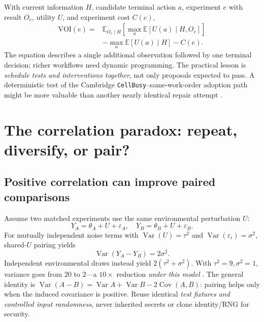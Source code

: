 \documentclass[10pt,twocolumn]{article}
\newcommand{\Ee}{\mathbb E}
\begin{document}
With current information $H$, candidate terminal action $a$, experiment $e$ with result $O_e$, utility $U$, and experiment cost $C(e),$
\begin{equation}\label{eq:voi}
\begin{aligned}
\mathrm{VOI}(e)={}&\Ee_{O_e\mid H}\!\left[\max_a\Ee[U(a)\mid H,O_e]\right]\\[-1pt]
&-\max_a\Ee[U(a)\mid H]-C(e).
\end{aligned}
\end{equation}
The equation describes a single additional observation followed by one terminal decision; richer workflows need dynamic programming. The practical lesson is \emph{schedule tests and interventions together}, not only proposals expected to pass. A deterministic test of the Cambridge \texttt{CellBusy}--same-work-order adoption path might be more valuable than another nearly identical repair attempt \cite{cam}.

\section{The correlation paradox: repeat, diversify, or pair?}

\subsection{Positive correlation can improve paired comparisons}
Assume two matched experiments use the same environmental perturbation $U$:
\begin{equation}\label{eq:paired}
 Y_A=\theta_A+U+\varepsilon_A,\quad
 Y_B=\theta_B+U+\varepsilon_B.
\end{equation}
For mutually independent noise terms with $\operatorname{Var}(U)=\tau^2$ and $\operatorname{Var}(\varepsilon_i)=\sigma^2$, shared-$U$ pairing yields
\begin{equation}\label{eq:variance}
\boxed{\operatorname{Var}(Y_A-Y_B)=2\sigma^2.}
\end{equation}
Independent environmental draws instead yield $2(\tau^2+\sigma^2)$. With $\tau^2=9,\sigma^2=1$, variance goes from $20$ to $2$---a $10\times$ reduction \emph{under this model} \cite{crn}. The general identity is $\operatorname{Var}(A-B)=\operatorname{Var}A+\operatorname{Var}B-2\operatorname{Cov}(A,B)$: pairing helps only when the induced covariance is positive. Reuse identical \emph{test fixtures and controlled input randomness}, never inherited secrets or clone identity/RNG for security.
\end{document}
